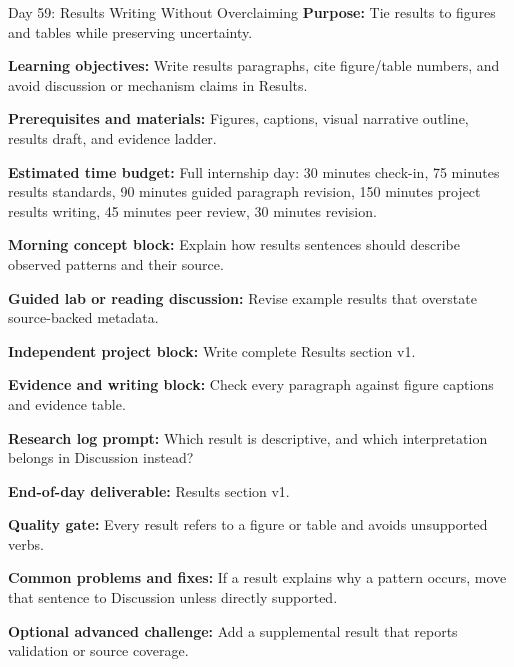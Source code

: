 \begin{dailybox}{Day 59: Results Writing Without Overclaiming}
\textbf{Purpose:} Tie results to figures and tables while preserving uncertainty.

\textbf{Learning objectives:} Write results paragraphs, cite figure/table numbers, and avoid discussion or mechanism claims in Results.

\textbf{Prerequisites and materials:} Figures, captions, visual narrative outline, results draft, and evidence ladder.

\textbf{Estimated time budget:} Full internship day: 30 minutes check-in, 75 minutes results standards, 90 minutes guided paragraph revision, 150 minutes project results writing, 45 minutes peer review, 30 minutes revision.

\textbf{Morning concept block:} Explain how results sentences should describe observed patterns and their source.

\textbf{Guided lab or reading discussion:} Revise example results that overstate source-backed metadata.

\textbf{Independent project block:} Write complete Results section v1.

\textbf{Evidence and writing block:} Check every paragraph against figure captions and evidence table.

\textbf{Research log prompt:} Which result is descriptive, and which interpretation belongs in Discussion instead?

\textbf{End-of-day deliverable:} Results section v1.

\textbf{Quality gate:} Every result refers to a figure or table and avoids unsupported verbs.

\textbf{Common problems and fixes:} If a result explains why a pattern occurs, move that sentence to Discussion unless directly supported.

\textbf{Optional advanced challenge:} Add a supplemental result that reports validation or source coverage.
\end{dailybox}

